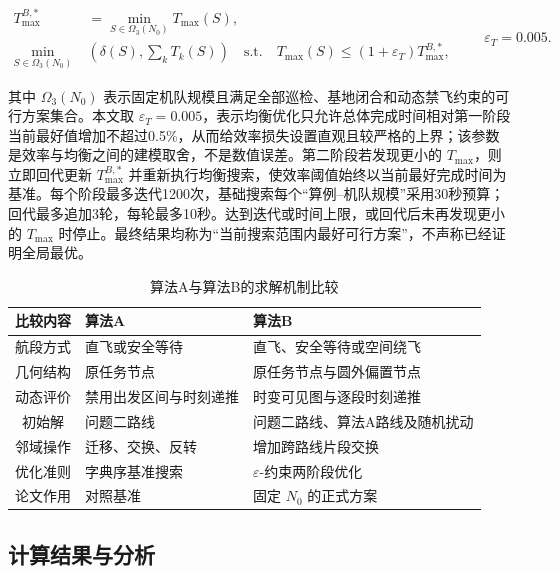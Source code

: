 \documentclass[UTF8,a4paper,12pt]{ctexart}
\numberwithin{equation}{section}
\numberwithin{equation}{section}
\begin{document}
\begin{equation}
\begin{aligned}
T_{\max}^{B,*}&=\min_{S\in\Omega_3(N_0)}T_{\max}(S),\\
\min_{S\in\Omega_3(N_0)}\;&\left(\delta(S),\sum_kT_k(S)\right)
\quad\text{s.t.}\quad T_{\max}(S)\leq(1+\varepsilon_T)T_{\max}^{B,*},
\end{aligned}
\qquad \varepsilon_T=0.005 .
\label{eq:q3-two-stage}
\end{equation}

其中 $\Omega_3(N_0)$ 表示固定机队规模且满足全部巡检、基地闭合和动态禁飞约束的可行方案集合。本文取 $\varepsilon_T=0.005$，表示均衡优化只允许总体完成时间相对第一阶段当前最好值增加不超过0.5\%，从而给效率损失设置直观且较严格的上界；该参数是效率与均衡之间的建模取舍，不是数值误差。第二阶段若发现更小的 $T_{\max}$，则立即回代更新 $T_{\max}^{B,*}$ 并重新执行均衡搜索，使效率阈值始终以当前最好完成时间为基准。每个阶段最多迭代1200次，基础搜索每个“算例--机队规模”采用30秒预算；回代最多追加3轮，每轮最多10秒。达到迭代或时间上限，或回代后未再发现更小的 $T_{\max}$ 时停止。最终结果均称为“当前搜索范围内最好可行方案”，不声称已经证明全局最优。

\begin{table}[H]
  \centering
  \caption{算法A与算法B的求解机制比较}
  \label{tab:q3-method-comparison}
  \small
  \begin{tabularx}{0.94\textwidth}{c >{\centering\arraybackslash}X >{\centering\arraybackslash}X}
    \toprule
    比较内容 & 算法A & 算法B \\
    \midrule
    航段方式 & 直飞或安全等待 & 直飞、安全等待或空间绕飞 \\
    几何结构 & 原任务节点 & 原任务节点与圆外偏置节点 \\
    动态评价 & 禁用出发区间与时刻递推 & 时变可见图与逐段时刻递推 \\
    初始解 & 问题二路线 & 问题二路线、算法A路线及随机扰动 \\
    邻域操作 & 迁移、交换、反转 & 增加跨路线片段交换 \\
    优化准则 & 字典序基准搜索 & $\varepsilon$-约束两阶段优化 \\
    论文作用 & 对照基准 & 固定 $N_0$ 的正式方案 \\
    \bottomrule
  \end{tabularx}
\end{table}

\subsection{计算结果与分析}
\end{document}
